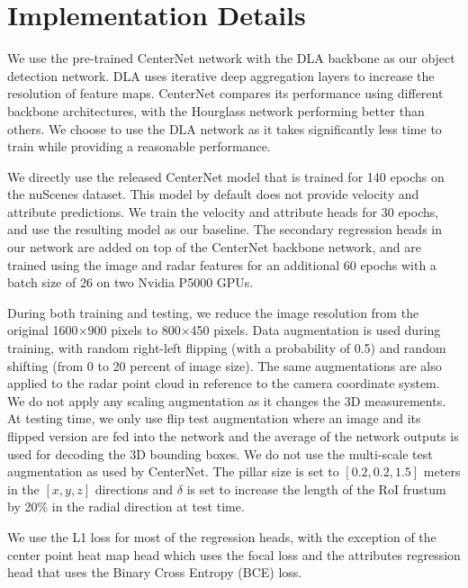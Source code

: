 \documentclass[10pt,twocolumn,letterpaper]{article}
\begin{document}
   
   
   \section{Implementation Details}
   We use the pre-trained CenterNet \cite{zhou2019objects} network with the 
   DLA \cite{yuDeepLayerAggregation2018} backbone as our object detection network. 
   DLA uses iterative deep aggregation layers to increase the resolution 
   of feature maps. CenterNet compares its performance using different backbone 
   architectures, with the Hourglass network \cite{newellHourglass2016a} performing
   better than others. We choose to use the DLA network as it takes significantly less
   time to train while providing a reasonable performance.
   
   We directly use the released CenterNet model that is trained for 140 epochs
   on the nuScenes dataset. This model by default does not 
   provide velocity and attribute predictions. We train the velocity and attribute 
   heads for 30 epochs, and use the resulting model as our baseline. 
   The secondary regression heads in our network are added on top of the CenterNet 
   backbone network, and are trained using
   the image and radar features for an additional 60 epochs with a batch size 
   of 26 on two Nvidia P5000 GPUs. 
   
   During both training and testing, we reduce the image resolution from the original
   1600$\times$900 pixels to 800$\times$450 pixels. Data augmentation is used 
   during training, with random right-left flipping (with a probability of 0.5) 
   and random shifting (from 0 to 20 percent of image size). The same augmentations
   are also applied to the radar point cloud in reference to the camera coordinate 
   system. We do not apply any scaling augmentation as it changes the 3D
   measurements. At testing time, we only use flip test augmentation where 
   an image and its flipped version are fed into the network and 
   the average of the network outputs is used for decoding the 3D bounding 
   boxes.
   We do not use the multi-scale test augmentation as used by 
   CenterNet. The pillar size is set to $[0.2, 0.2, 1.5]$  meters in the 
   $[x,y,z]$ directions and $\delta$ is 
   set to increase the length of the RoI frustum by 20\% in the radial direction 
   at test time.
   
   We use the L1 loss for most of the regression heads, with the exception of 
   the center point heat map head which uses the focal loss and the attributes
   regression head that uses the Binary Cross Entropy (BCE) loss.
   
\end{document}
